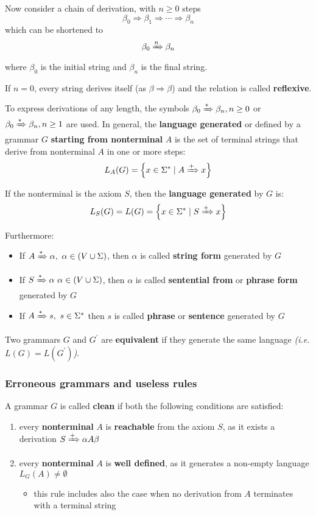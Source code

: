 \documentclass[english]{article}
\begin{document}
Now consider a chain of derivation, with \(n \geq 0\) steps
\[ \beta_0 \Rightarrow \beta_1 \Rightarrow \cdots \Rightarrow \beta_n \]
which can be shortened to
\[ \beta_0 \xRightarrow{n} \beta_n \]
where \(\beta_0\) is the initial string and \(\beta_n\) is the final string.

If \(n = 0\), every string derives itself (as \(\beta \Rightarrow \beta\)) and the relation is called \textbf{reflexive}.

To express derivations of any length, the symbols \(\beta_0 \xRightarrow{\ast} \beta_n, n \geq 0\) or \(\beta_0 \xRightarrow{\ast} \beta_n, n \geq 1\) are used.
In general, the \textbf{language generated} or defined by a grammar \(G\) \textbf{starting from nonterminal} \(A\) is the set of terminal strings that derive from nonterminal \(A\) in one or more steps:
\[ L_A(G) = \left\{x \in \Sigma^\ast \mid A \xRightarrow{+} x \right\} \]

If the nonterminal is the axiom \(S\), then the \textbf{language generated} by \(G\) is:
\[ L_S(G) = L(G) = \left\{x \in \Sigma^\ast \mid S \xRightarrow{+} x \right\} \]

\bigskip
Furthermore:

\begin{itemize}
  \item If \(A \xRightarrow{\ast} \alpha, \ \alpha \in (V \cup \Sigma)\), then \(\alpha\) is called \textbf{string form} generated by \(G\)
  \item If \(S \xRightarrow{\ast} \alpha \ \alpha \in (V \cup \Sigma)\), then \(\alpha\) is called \textbf{sentential from} or \textbf{phrase form} generated by \(G\)
  \item If \(A \xRightarrow{\ast} s, \ s \in \Sigma^\ast\) then \(s\) is called \textbf{phrase} or \textbf{sentence} generated by \(G\)
\end{itemize}

\bigskip
Two grammars \(G\) and \(G^\prime\) are \textbf{equivalent} if they generate the same language \textit{(i.e. \(L(G) = L(G^\prime)\))}.

\subsubsection{Erroneous grammars and useless rules}

A grammar \(G\) is called \textbf{clean} if both the following conditions are satisfied:

\begin{enumerate}
  \item every \textbf{nonterminal} \(A\) is \textbf{reachable} from the axiom \(S\), as it exists a derivation \(S \xRightarrow{+} \alpha A \beta\)
  \item every \textbf{nonterminal} \(A\) is \textbf{well defined}, as it generates a non-empty language \(L_G(A) \neq \emptyset\)
        \begin{itemize}[label=\(\rightarrow\)]
          \item this rule includes also the case when no derivation from \(A\) terminates with a terminal string
        \end{itemize}
\end{enumerate}
\end{document}
